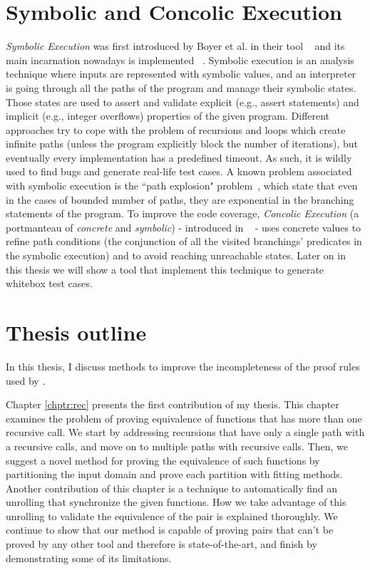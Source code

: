 \section{Symbolic and Concolic Execution}
\label{sec:symbex}
\emph{Symbolic Execution} was first introduced by Boyer et al. in their tool ~\cite{10.1145/390016.808445} and its main incarnation nowadays is implemented ~\cite{10.5555/1855741.1855756}. Symbolic execution is an analysis technique where inputs are represented with symbolic values, and an interpreter is going through all the paths of the program and manage their symbolic states. Those states are used to assert and validate explicit (e.g., assert statements) and implicit (e.g., integer overflows) properties of the given program. Different approaches try to cope with the problem of recursions and loops which create infinite paths (unless the program explicitly block the number of iterations), but eventually every implementation has a predefined timeout. As such, it is wildly used to find bugs and generate real-life test cases. A known problem associated with symbolic execution is the ``path explosion" problem~\cite{10.1007/978-3-540-78800-3_28}, which state that even in the cases of bounded number of paths, they are exponential in the branching statements of the program. To improve the code coverage, \emph{Concolic Execution} (a portmanteau of \emph{concrete} and \emph{symbolic}) - introduced in ~\cite{10.1145/1064978.1065036} -  uses concrete values to refine path conditions (the conjunction of all the visited branchings' predicates in the symbolic execution) and to avoid reaching unreachable states. Later on in this thesis we will show a tool that implement this technique to generate whitebox test cases.

\section{Thesis outline}
\label{sec:outline}
In this thesis, I discuss methods to improve the incompleteness of the proof rules used by . 

Chapter \ref{chptr:rec} presents the first contribution of my thesis. This chapter examines the problem of proving equivalence of functions that has more than one recursive call. We start by addressing recursions that have only a single path with a recursive calls, and move on to multiple paths with recursive calls. Then, we suggest a novel method for proving the equivalence of such functions by partitioning the input domain and prove each partition with fitting methods. Another contribution of this chapter is a technique to automatically find an unrolling that synchronize the given functions. How we take advantage of this unrolling to validate the equivalence of the pair is explained thoroughly. We continue to show that our method is capable of proving pairs that can't be proved by any other tool and therefore is state-of-the-art, and finish by demonstrating some of its limitations.

